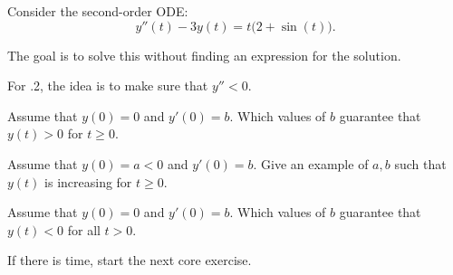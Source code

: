\question \label{2nd:analysis:ode1}
	Consider the second-order ODE:
	$$
	y''(t) - 3y(t) = t \big( 2 + \sin(t) \big).
	$$
	
\begin{annotation}
\begin{goals}
	The goal is to solve this without finding an expression for the solution.
	
	For .2, the idea is to make sure that $y''<0$. 
\end{goals}	
\end{annotation}
	\begin{parts}
		\item Assume that $y(0)=0$ and $y'(0)=b$. Which values of $b$ guarantee that $y(t)>0$ for $t\geq 0$. 
		\item Assume that $y(0)=a<0$ and $y'(0)=b$. Give an example of $a,b$ such that $y(t)$ is increasing for $t\geq 0$. 
		\item Assume that $y(0)=0$ and $y'(0)=b$. Which values of $b$ guarantee that $y(t)<0$ for all $t>0$.
\begin{annotation}
\begin{goals}
	If there is time, start the next core exercise.
\end{goals}
\end{annotation}


%

	\end{parts}


	

\bookonlynewpage

